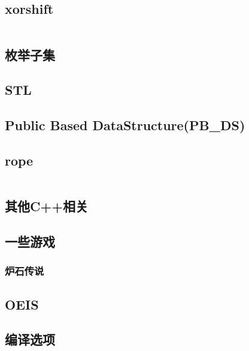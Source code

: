 \documentclass[a4paper, twoside]{article}
\begin{document}
\begin{multicols}{2}
			\subsection{xorshift}
				\inputminted{cpp}{../src/misc/xorshift.cpp}
			
			\subsection{枚举子集}
				
				
			\subsection{STL}
				

			\subsection{Public Based DataStructure(PB\_DS)}
				\label{pbds}
				

			\subsection{rope}
				\inputminted{cpp}{../src/misc/rope.cpp}
			
			\subsection{其他C++相关}
				
			
			\subsection{一些游戏}
				\subsubsection{炉石传说}
					

			\subsection{OEIS}
				\label{oeis}
				
			
			\subsection{编译选项}
				
				

\end{multicols}
\end{document}
